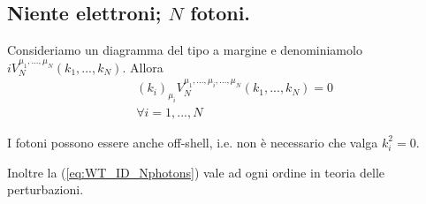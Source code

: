 \documentclass[../main.tex]{subfiles}
\begin{document}
\subsection{Niente elettroni; $N$ fotoni.}
\begin{theorem}
    Consideriamo un diagramma del tipo a margine 
     e denominiamolo 
    \(iV_N^{\mu_1,...,\mu_N}(k_1,...,k_N)\). Allora 
    \begin{equation}
        \boxed{\begin{aligned} 
            &(k_i)_{\mu_i}V_N^{\mu_1,..., \mu_i, ...,\mu_N}(k_1,...,k_N) =0 \\
            &\forall i = 1,...,N
        \end{aligned}}
        \label{eq:WT_ID_Nphotons}
    \end{equation}
\end{theorem}
I fotoni possono essere anche off-shell, i.e. non è necessario che valga $k_i^2 = 0$.

Inoltre la (\ref{eq:WT_ID_Nphotons}) vale ad ogni ordine in teoria delle perturbazioni.
\end{document}
